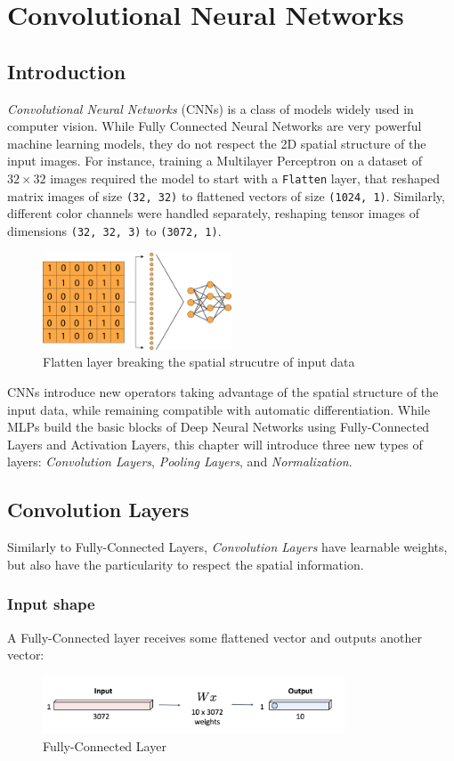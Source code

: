 \section{Convolutional Neural Networks}
\subsection{Introduction}
\emph{Convolutional Neural Networks} (CNNs) is a class of models widely used in computer vision. While Fully Connected Neural Networks are very powerful machine learning models, they do not respect the 2D spatial structure of the input images. For instance, training a Multilayer Perceptron on a dataset of $32\times 32$ images required the model to start with a \texttt{Flatten} layer, that reshaped matrix images of size \texttt{(32, 32)} to flattened vectors of size \texttt{(1024, 1)}. Similarly, different color channels were handled separately, reshaping tensor images of dimensions \texttt{(32, 32, 3)} to \texttt{(3072, 1)}.

\begin{figure}[H]
    \centering
    \includegraphics[width=0.5\textwidth]{images/flatten.png}
    \caption{Flatten layer breaking the spatial strucutre of input data}
\end{figure}

CNNs introduce new operators taking advantage of the spatial structure of the input data, while remaining compatible with automatic differentiation. While MLPs build the basic blocks of Deep Neural Networks using Fully-Connected Layers and Activation Layers, this chapter will introduce three new types of layers: \emph{Convolution Layers}, \emph{Pooling Layers}, and \emph{Normalization}.

\subsection{Convolution Layers}
Similarly to Fully-Connected Layers, \emph{Convolution Layers} have learnable weights, but also have the particularity to respect the spatial information.

\subsubsection{Input shape}
A Fully-Connected layer receives some flattened vector and outputs another vector:
\begin{figure}[H]
    \centering
    \includegraphics[width=0.8\textwidth]{images/fully-connected.png}
    \caption{Fully-Connected Layer}
\end{figure}


